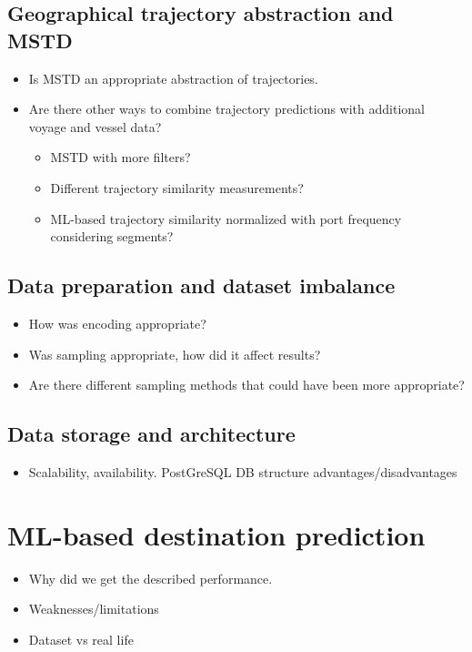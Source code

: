 \subsection{Geographical trajectory abstraction and MSTD}
\begin{itemize}
    \item Is MSTD an appropriate abstraction of trajectories.
    \item Are there other ways to combine trajectory predictions with additional voyage and vessel data?
    \begin{itemize}
        \item MSTD with more filters?
        \item Different trajectory similarity measurements?
        \item ML-based trajectory similarity normalized with port frequency considering segments?
    \end{itemize}
\end{itemize}

\subsection{Data preparation and dataset imbalance}
\begin{itemize}
    \item How was encoding appropriate?
    \item Was sampling appropriate, how did it affect results?
    \item Are there different sampling methods that could have been more appropriate?
\end{itemize}

\subsection{Data storage and architecture}
\begin{itemize}
    \item Scalability, availability. PostGreSQL DB structure advantages/disadvantages
\end{itemize}

\section{ML-based destination prediction}
\begin{itemize}
    \item Why did we get the described performance.
    \item Weaknesses/limitations
    \item Dataset vs real life
\end{itemize}

